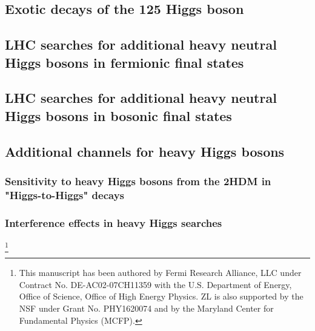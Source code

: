 \documentclass[../report.tex]{subfiles}
\providecommand{\main}{..}
\begin{document}
 

%

\subsection{Exotic decays of the 125 \UGeV Higgs boson}\label{Sec:9.1Exo}









\subsection{LHC searches for additional heavy neutral Higgs bosons in fermionic final states}\label{sec:Hff}




\subsection{LHC searches for additional heavy neutral Higgs bosons in bosonic final states}\label{sec:XZZ}


\subsection{Additional channels for heavy Higgs bosons}\label{Sec:9.4}




\subsubsection{Sensitivity to heavy Higgs bosons from the 2HDM in "Higgs-to-Higgs" decays}




\subsubsection{Interference effects in heavy Higgs searches}\label{Sec.9.4.2}
\footnote{This manuscript has been authored by Fermi Research Alliance, LLC under Contract No. DE-AC02-07CH11359 with the U.S. Department of Energy, Office of Science, Office of High Energy Physics. ZL is also supported by the NSF under Grant No. PHY1620074 and by the Maryland Center for Fundamental Physics (MCFP).}
\end{document}
